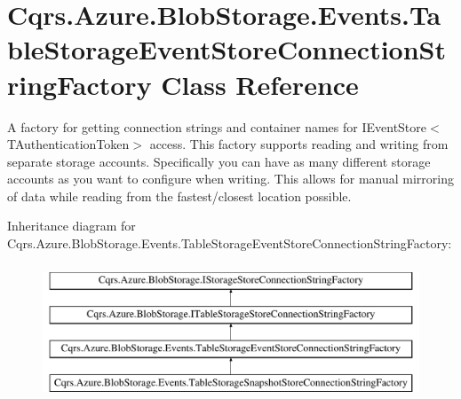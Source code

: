 \hypertarget{classCqrs_1_1Azure_1_1BlobStorage_1_1Events_1_1TableStorageEventStoreConnectionStringFactory}{}\section{Cqrs.\+Azure.\+Blob\+Storage.\+Events.\+Table\+Storage\+Event\+Store\+Connection\+String\+Factory Class Reference}
\label{classCqrs_1_1Azure_1_1BlobStorage_1_1Events_1_1TableStorageEventStoreConnectionStringFactory}


A factory for getting connection strings and container names for I\+Event\+Store$<$\+T\+Authentication\+Token$>$ access. This factory supports reading and writing from separate storage accounts. Specifically you can have as many different storage accounts as you want to configure when writing. This allows for manual mirroring of data while reading from the fastest/closest location possible.  


Inheritance diagram for Cqrs.\+Azure.\+Blob\+Storage.\+Events.\+Table\+Storage\+Event\+Store\+Connection\+String\+Factory\+:\begin{figure}[H]
\begin{center}
\leavevmode
\includegraphics[height=4.000000cm]{classCqrs_1_1Azure_1_1BlobStorage_1_1Events_1_1TableStorageEventStoreConnectionStringFactory}
\end{center}
\end{figure}
